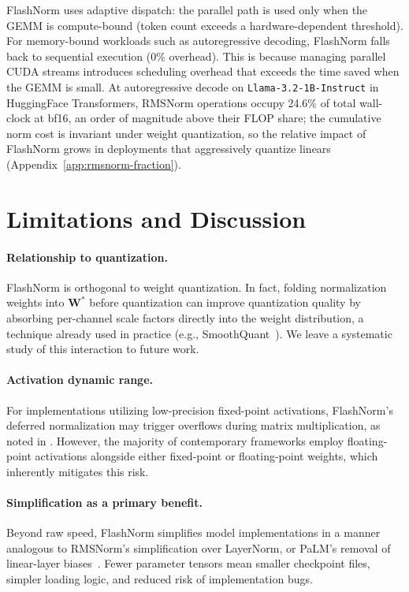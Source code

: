 \documentclass{article}
\begin{document}
FlashNorm uses adaptive dispatch: the parallel path is used only when the GEMM is compute-bound (token count exceeds a hardware-dependent threshold). For memory-bound workloads such as autoregressive decoding, FlashNorm falls back to sequential execution (0\% overhead). This is because managing parallel CUDA streams introduces scheduling overhead that exceeds the time saved when the GEMM is small. At autoregressive decode on \texttt{Llama-3.2-1B-Instruct} in HuggingFace Transformers, RMSNorm operations occupy 24.6\% of total wall-clock at bf16, an order of magnitude above their FLOP share; the cumulative norm cost is invariant under weight quantization, so the relative impact of FlashNorm grows in deployments that aggressively quantize linears (Appendix~\ref{app:rmsnorm-fraction}).

\section{Limitations and Discussion}\label{sec:limitations-discussion}

\paragraph{Relationship to quantization.}
FlashNorm is orthogonal to weight quantization. In fact, folding normalization
weights into $\mathbf{W}^*$ before quantization can improve quantization quality
by absorbing per-channel scale factors directly into the weight distribution,
a technique already used in practice (e.g., SmoothQuant~\citep{smoothQuant}). We leave a systematic
study of this interaction to future work.

\paragraph{Activation dynamic range.}
For implementations utilizing low-precision fixed-point activations, FlashNorm's deferred
normalization may trigger overflows during matrix multiplication, as noted in \citep{MXNorm}.
However, the majority of contemporary frameworks employ floating-point activations alongside
either fixed-point or floating-point weights, which inherently mitigates this risk.

\paragraph{Simplification as a primary benefit.}
Beyond raw speed, FlashNorm simplifies model implementations in a manner analogous
to RMSNorm's simplification over LayerNorm, or PaLM's removal of linear-layer
biases~\citep{PaLM}. Fewer parameter tensors mean smaller checkpoint
files, simpler loading logic, and reduced risk of implementation bugs.
\end{document}
